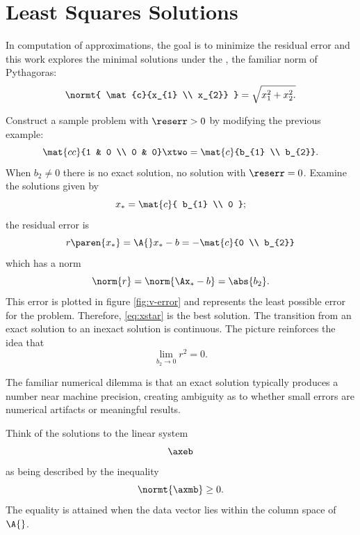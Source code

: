 \section{Least Squares Solutions}  
In computation of approximations, the goal is to minimize the residual error and this work explores the minimal solutions under the \nrmt, the familiar norm of Pythagoras:
%
\begin{equation*}
	\normt{ \mat{c}{x_{1} \\ x_{2}} } = \sqrt{x_{1}^{2} + x_{2}^{2}.}
\end{equation*}
%

Construct a sample problem with $\reserr > 0$ by modifying the previous example:
%
\begin{equation}
	\mat{cc}{1 & 0 \\ 0 & 0} \xtwo = \mat{c}{b_{1} \\ b_{2}} .
	\label{eq:simple case}
\end{equation}
%
When $b_{2} \ne 0$ there is no exact solution, no solution with $\reserr = 0$. Examine the solutions given by
%
\begin{equation}
	x_{*} = \mat{c}{ b_{1} \\ 0 } ;
\label{eq:xstar}
\end{equation}
%
the residual error is 
$$r\paren{x_{*}}=\A{} x_{*} - b = -\mat{c}{0 \\ b_{2}}$$
which has a norm 
\begin{equation}
	\norm{r} = \norm{\Ax_{*} - b} = \abs{b_{2}}.
\label{eq:simple case solution}
\end{equation}
This error is plotted in figure \ref{fig:v-error} and represents the least possible error for the problem. Therefore, \eqref{eq:xstar} is the best solution. The transition from an exact solution to an inexact solution is continuous. The picture reinforces the idea that
%
\begin{equation*}
	\lim_{b_{2}\to 0} {r^{2}} = 0.
\end{equation*}

The familiar numerical dilemma is that an exact solution typically produces a number near machine precision, creating ambiguity as to whether small errors are numerical artifacts or meaningful results.
%

%

Think of the solutions to the linear system
\begin{equation*}
	\axeb
\end{equation*}
as being described by the inequality
\begin{equation*}
	\normt{\axmb} \ge 0.
\end{equation*}
The equality is attained when the data vector lies within the column space of $\A{}$.

